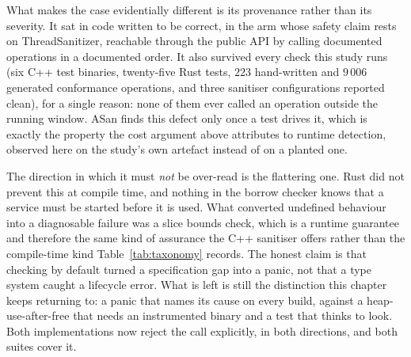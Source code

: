 \documentclass[english,twoside,openright,a4paper,censored,csm,software-track-2020]{HYthesisML}
\begin{document}
What makes the case evidentially different is its provenance rather than its severity. It sat in
code written to be correct, in the arm whose safety claim rests on ThreadSanitizer, reachable
through the public API by calling documented operations in a documented order. It also survived
every check this study runs (six C++ test binaries, twenty-five Rust tests, $223$
hand-written and $9\,006$ generated conformance operations, and three sanitiser configurations
reported clean), for a single reason: none of them ever called an operation outside the running
window. ASan finds this defect only once a test drives it, which is exactly the property the cost
argument above attributes to runtime detection, observed here on the study's own artefact instead
of on a planted one.

The direction in which it must \emph{not} be over-read is the flattering one. Rust did not
prevent this at compile time, and nothing in the borrow checker knows that a service must be
started before it is used. What converted undefined behaviour into a diagnosable failure was a
slice bounds check, which is a runtime guarantee and therefore the same kind of assurance the
C++ sanitiser offers rather than the compile-time kind Table~\ref{tab:taxonomy} records. The
honest claim is that checking by default turned a specification gap into a panic, not that a
type system caught a lifecycle error. What is left is still the distinction this chapter keeps
returning to: a panic that names its cause on every build, against a heap-use-after-free that
needs an instrumented binary and a test that thinks to look. Both implementations now reject the
call explicitly, in both directions, and both suites cover it.
\end{document}
